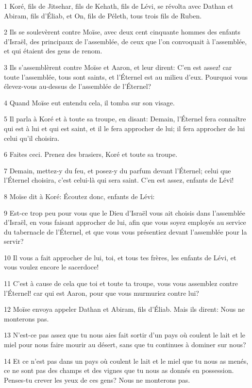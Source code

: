 \par 1 Koré, fils de Jitsehar, fils de Kehath, fils de Lévi, se révolta avec Dathan et Abiram, fils d'Éliab, et On, fils de Péleth, tous trois fils de Ruben.
\par 2 Ils se soulevèrent contre Moïse, avec deux cent cinquante hommes des enfants d'Israël, des principaux de l'assemblée, de ceux que l'on convoquait à l'assemblée, et qui étaient des gens de renom.
\par 3 Ils s'assemblèrent contre Moïse et Aaron, et leur dirent: C'en est assez! car toute l'assemblée, tous sont saints, et l'Éternel est au milieu d'eux. Pourquoi vous élevez-vous au-dessus de l'assemblée de l'Éternel?
\par 4 Quand Moïse eut entendu cela, il tomba sur son visage.
\par 5 Il parla à Koré et à toute sa troupe, en disant: Demain, l'Éternel fera connaître qui est à lui et qui est saint, et il le fera approcher de lui; il fera approcher de lui celui qu'il choisira.
\par 6 Faites ceci. Prenez des brasiers, Koré et toute sa troupe.
\par 7 Demain, mettez-y du feu, et posez-y du parfum devant l'Éternel; celui que l'Éternel choisira, c'est celui-là qui sera saint. C'en est assez, enfants de Lévi!
\par 8 Moïse dit à Koré: Écoutez donc, enfants de Lévi:
\par 9 Est-ce trop peu pour vous que le Dieu d'Israël vous ait choisis dans l'assemblée d'Israël, en vous faisant approcher de lui, afin que vous soyez employés au service du tabernacle de l'Éternel, et que vous vous présentiez devant l'assemblée pour la servir?
\par 10 Il vous a fait approcher de lui, toi, et tous tes frères, les enfants de Lévi, et vous voulez encore le sacerdoce!
\par 11 C'est à cause de cela que toi et toute ta troupe, vous vous assemblez contre l'Éternel! car qui est Aaron, pour que vous murmuriez contre lui?
\par 12 Moïse envoya appeler Dathan et Abiram, fils d'Éliab. Mais ils dirent: Nous ne monterons pas.
\par 13 N'est-ce pas assez que tu nous aies fait sortir d'un pays où coulent le lait et le miel pour nous faire mourir au désert, sans que tu continues à dominer sur nous?
\par 14 Et ce n'est pas dans un pays où coulent le lait et le miel que tu nous as menés, ce ne sont pas des champs et des vignes que tu nous as donnés en possession. Penses-tu crever les yeux de ces gens? Nous ne monterons pas.

